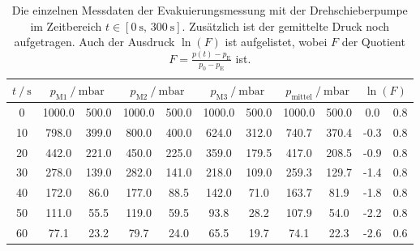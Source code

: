   \begin{table}[h]
    \centering
    \caption{Die einzelnen Messdaten der Evakuierungsmessung mit der Drehschieberpumpe im Zeitbereich $t \in [\SI{0}{\second}, \, \SI{300}{\second}]$. 
    Zusätzlich ist der gemittelte Druck noch aufgetragen. 
    Auch der Ausdruck $\ln(F)$ ist aufgelistet, wobei $F$ der Quotient $F = \frac{p(t) - p_\text{E}}{p_0 - p_\text{E}}$ ist. }
    \label{tab:dreh_eva}
    \begin{tabular}{S[table-format=3.0] S @{${}\pm{}$} S[table-format=3.1] S @{${}\pm{}$} S[table-format=3.1] S @{${}\pm{}$} S[table-format=3.1] S @{${}\pm{}$} S[table-format=3.1] S[table-format=2.1] @{${}\pm{}$} S[table-format=1.1]}
      \toprule
      {$t \mathbin{/} \si{\second}$} &  &  &  &   &  \\
       & 1000.0 & 500.0 & 1000.0 & 500.0 &1000.0 & 500.0 &1000.0 & 500.0 &  0.0 & 0.8 \\
       10 &  798.0 & 399.0 &  800.0 & 400.0 & 624.0 & 312.0 & 740.7 & 370.4 & -0.3 & 0.8 \\
       20 &  442.0 & 221.0 &  450.0 & 225.0 & 359.0 & 179.5 & 417.0 & 208.5 & -0.9 & 0.8 \\
       30 &  278.0 & 139.0 &  282.0 & 141.0 & 218.0 & 109.0 & 259.3 & 129.7 & -1.4 & 0.8 \\
       40 &  172.0 &  86.0 &  177.0 &  88.5 & 142.0 &  71.0 & 163.7 &  81.9 & -1.8 & 0.8 \\
       50 &  111.0 &  55.5 &  119.0 &  59.5 &  93.8 &  28.2 & 107.9 &  54.0 & -2.2 & 0.8 \\
       60 &   77.1 &  23.2 &   79.7 &  24.0 &  65.5 &  19.7 &  74.1 &  22.3 & -2.6 & 0.6 \\

\end{tabular}
\end{table}
